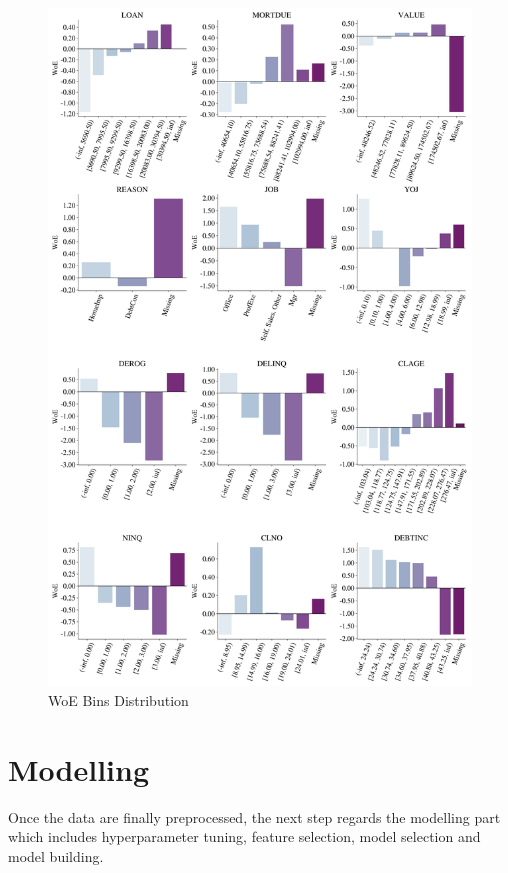         \begin{figure}[H]
            \centering
            \caption{WoE Bins Distribution}\vspace{0.5em}
            \label{fig:woedist}
            \includegraphics[width=150mm]{Figures/WoE_Distribution.jpg}
            \vspace{-1em}
        \end{figure}
        

        \section{Modelling}
        Once the data are finally preprocessed, the next step regards the modelling part which includes hyperparameter tuning, feature selection, model selection and model building.
        
